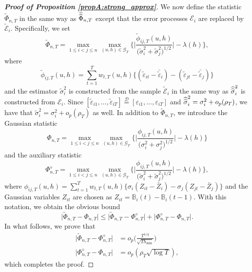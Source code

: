 \documentclass[12pt]{article}
\begin{document}
\begin{proof}[\textnormal{\textbf{Proof of Proposition \ref{propA:strong_approx}}}]
We now define the statistic $\widetilde{\Phi}_{n,T}$ in the same way as $\widehat{\widehat{\Phi}}_{n, T}$ except that the error processes $\mathcal{E}_i$ are replaced by $\widetilde{\mathcal{E}}_i$. Specifically, we set
\[ \widetilde{\Phi}_{n,T} = \max_{1 \le i < j \le n}\max_{(u,h) \in \mathcal{G}_T} \Bigg\{ \bigg|\frac{\widetilde{\phi}_{ij, T}(u,h)}{\big(\widetilde{\sigma}_i^2 + \widetilde{\sigma}_j^2 \big)^{1/2}} \bigg| - \lambda(h)\Bigg\}, \]
where
\[ \widetilde{\phi}_{ij, T}(u,h) = \sum\limits_{t=1}^T w_{t,T}(u,h) \big\{ (\widetilde{\varepsilon}_{it} - \bar{\widetilde{\varepsilon}}_i)  - (\widetilde{\varepsilon}_{jt} - \bar{\widetilde{\varepsilon}}_j)\big\} \]
and the estimator $\widetilde{\sigma}^2_i$ is constructed from the sample $\widetilde{\mathcal{E}}_i$ in the same way as $\widehat{\widehat{\sigma}}^2_i$ is constructed from $\mathcal{E}_i$. Since $[\widetilde{\varepsilon}_{i1},\ldots,\widetilde{\varepsilon}_{iT}] \stackrel{\mathcal{D}}{=} [\varepsilon_{i1},\ldots,\varepsilon_{iT}]$ and $\widehat{\widehat{\sigma}}_i^2 = \sigma_i^2 + o_p(\rho_T)$, we have that $\widetilde{\sigma}_i^2 = \sigma_i^2 + o_p(\rho_T)$ as well. In addition to $\widetilde{\Phi}_{n,T}$, we introduce the Gaussian statistic
\[ \Phi_{n, T} = \max_{1\leq i< j \leq n}\max_{(u,h) \in \mathcal{G}_T} \bigg\{ \bigg|\frac{\phi_{ij, T}(u,h)}{\big(\sigma_i^2 + \sigma_j^2 \big)^{1/2}}\bigg| - \lambda(h) \bigg\} \]
and the auxiliary statistic 
\[ \Phi_{n, T}^{\diamond} = \max_{1\leq i<j \leq n}\max_{(u,h) \in \mathcal{G}_T} \bigg\{ \bigg|\frac{\phi_{ij, T}(u,h)}{\big(\widetilde{\sigma}_i^2 + \widetilde{\sigma}_j^2 \big)^{1/2}}\bigg| - \lambda(h) \bigg\}, \]
where $\phi_{ij,T}(u,h) = \sum\nolimits_{t=1}^T w_{t,T}(u,h) \{ \sigma_i (Z_{it} - \bar{Z}_i) - \sigma_j (Z_{jt} - \bar{Z}_j) \}$ and the Gaussian variables $Z_{it}$ are chosen as $Z_{it} = \mathbb{B}_i(t) - \mathbb{B}_i(t-1)$. With this notation, we obtain the obvious bound 
\begin{equation*}
\big| \widetilde{\Phi}_{n, T} - \Phi_{n, T} \big| \le \big| \widetilde{\Phi}_{n, T} - \Phi_{n, T}^{\diamond} \big| + \big| \Phi_{n, T}^{\diamond} - \Phi_{n, T} \big|. 
\end{equation*}
In what follows, we prove that 
\begin{align}
\big| \widetilde{\Phi}_{n, T} - \Phi_{n, T}^{\diamond} \big| & = o_p\Big( \frac{T^{1/q}}{\sqrt{Th_{\min}}} \Big) \label{eq-strongapprox-bound-A} \\
\big| \Phi_{n, T}^{\diamond} - \Phi_{n, T} \big| & = o_p(\rho_T \sqrt{\log T}), \label{eq-strongapprox-bound-B}
\end{align}
which completes the proof. 



\end{proof}
\end{document}
